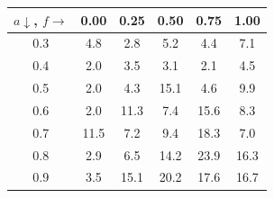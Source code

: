 \begin{tabular}{c|ccccc}
\toprule
$a \downarrow$, $f \rightarrow$ & 0.00 & 0.25 & 0.50 & 0.75 & 1.00 \\
\midrule
0.3 & 4.8 & 2.8 & 5.2 & 4.4 & 7.1 \\
0.4 & 2.0 & 3.5 & 3.1 & 2.1 & 4.5 \\
0.5 & 2.0 & 4.3 & 15.1 & 4.6 & 9.9 \\
0.6 & 2.0 & 11.3 & 7.4 & 15.6 & 8.3 \\
0.7 & 11.5 & 7.2 & 9.4 & 18.3 & 7.0 \\
0.8 & 2.9 & 6.5 & 14.2 & 23.9 & 16.3 \\
0.9 & 3.5 & 15.1 & 20.2 & 17.6 & 16.7 \\
\bottomrule
\end{tabular}